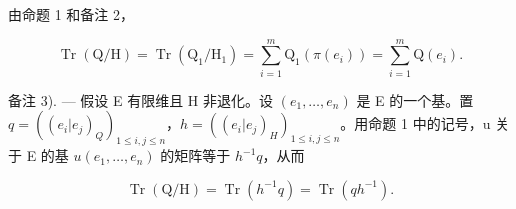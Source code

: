 由命题 1 和备注 2，

\[
\operatorname{Tr} \left(\mathrm{Q} / \mathrm{H}\right) = \operatorname{Tr} \left(\mathrm{Q} _ {1} / \mathrm{H} _ {1}\right) = \sum_ {i = 1} ^ {m} \mathrm{Q} _ {1} \left(\pi (e _ {i})\right) = \sum_ {i = 1} ^ {m} \mathrm{Q} (e _ {i}).\tag{Q.E.D.}
\]

备注 3). --- 假设 E 有限维且 H 非退化。设 \((e_1, \ldots, e_n)\) 是 E 的一个基。置 \(q = ((e_i | e_j)_Q)_{1 \leqslant i, j \leqslant n}\)，\(h = ((e_i | e_j)_H)_{1 \leqslant i, j \leqslant n}\)。用命题 1 中的记号，u 关于 E 的基 \(u\)\((e_1, \ldots, e_n)\) 的矩阵等于 \(h^{-1}q\)，从而

\[
\operatorname{Tr} \left(\mathrm{Q} / \mathrm{H}\right) = \operatorname{Tr} \left(h ^ {- 1} q\right) = \operatorname{Tr} \left(q h ^ {- 1}\right).\tag{2}
\]


